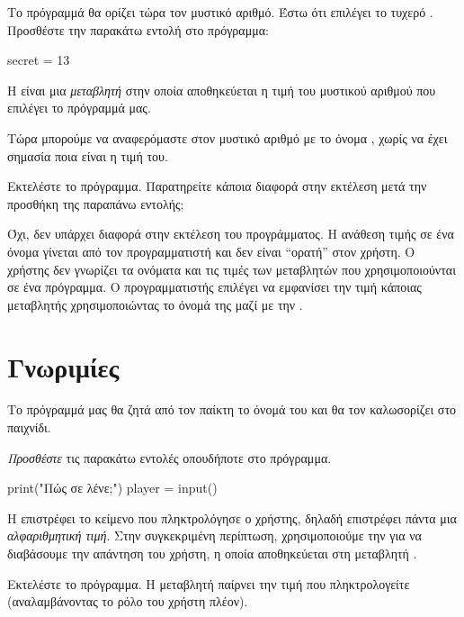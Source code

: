 \documentclass[a4paper,11pt,oneside]{book}
\begin{document}
\begin{step}
\label{step:secret-assign}
Το πρόγραμμά θα ορίζει τώρα τον μυστικό αριθμό. Έστω ότι επιλέγει το τυχερό . Προσθέστε την παρακάτω εντολή στο πρόγραμμα:

\begin{pynew}
secret = 13
\end{pynew}

Η  είναι μια \emph{μεταβλητή} στην οποία αποθηκεύεται η τιμή του μυστικού αριθμού που επιλέγει το πρόγραμμά μας. 

Τώρα μπορούμε να αναφερόμαστε στον μυστικό αριθμό με το όνομα , χωρίς να έχει σημασία ποια είναι η τιμή του.

Εκτελέστε το πρόγραμμα. Παρατηρείτε κάποια διαφορά στην εκτέλεση μετά την προσθήκη της παραπάνω εντολής;

\begin{answer}
Όχι, δεν υπάρχει διαφορά στην εκτέλεση του προγράμματος. Η ανάθεση τιμής σε ένα όνομα γίνεται από τον προγραμματιστή και δεν είναι ``ορατή'' στον χρήστη. Ο χρήστης δεν γνωρίζει τα ονόματα και τις τιμές των μεταβλητών που χρησιμοποιούνται σε ένα πρόγραμμα. Ο προγραμματιστής επιλέγει να εμφανίσει την τιμή κάποιας μεταβλητής χρησιμοποιώντας το όνομά της μαζί με την .
\end{answer}
\end{step}

\section{Γνωριμίες}
Το πρόγραμμά μας θα ζητά από τον παίκτη το όνομά του και θα τον καλωσορίζει στο παιχνίδι.

\begin{step}
\label{step:name-input}
\emph{Προσθέστε} τις παρακάτω εντολές οπουδήποτε στο πρόγραμμα.

\begin{pynew}
print("Πώς σε λένε;")
player = input()
\end{pynew}

Η  επιστρέφει το κείμενο που πληκτρολόγησε ο χρήστης, δηλαδή επιστρέφει πάντα μια \emph{αλφαριθμητική τιμή}. Στην συγκεκριμένη περίπτωση, χρησιμοποιούμε την  για να διαβάσουμε την απάντηση του χρήστη, η οποία αποθηκεύεται στη μεταβλητή .

Εκτελέστε το πρόγραμμα. Η μεταβλητή  παίρνει την τιμή που πληκτρολογείτε (αναλαμβάνοντας το ρόλο του χρήστη πλέον).
\end{step}
\end{document}
